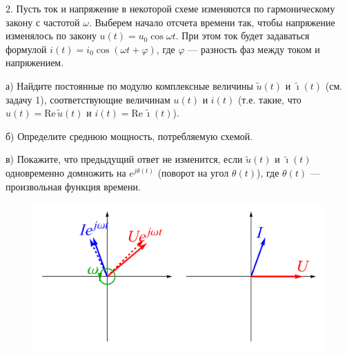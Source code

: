 \documentclass[14pt]{article}
\begin{document}
2. Пусть ток и напряжение в некоторой схеме изменяются по гармоническому закону с частотой $\omega$. Выберем начало отсчета времени так, чтобы напряжение изменялось по закону $u(t)=u_0\cos\omega t$. При этом ток будет задаваться формулой $i(t)=i_0\cos (\omega t+\varphi)$, где $\varphi$ --- разность фаз между током и напряжением.

а) Найдите постоянные по модулю комплексные величины $\tilde{u}(t)$ и $\tilde{\imath}(t)$ (см. задачу 1), соответствующие величинам $u(t)$ и $i(t)$ (т.е. такие, что $u(t)=\text{Re}\,\tilde{u}(t)$ и $i(t)=\text{Re}\,\tilde{\imath}(t)$).

б) Определите среднюю мощность, потребляемую схемой.

в) Покажите, что предыдущий ответ не изменится, если $\tilde{u}(t)$ и $\tilde{\imath}(t)$ одновременно домножить на $e^{j\theta(t)}$ (поворот на угол $\theta(t)$), где $\theta(t)$ --- произвольная функция времени.

\begin{figure}
\begin{center}
\vspace{-5mm}
\includegraphics[scale=0.4]{impedance2.pdf}
\end{center}
\vspace{-3mm}
\end{figure}
\end{document}
